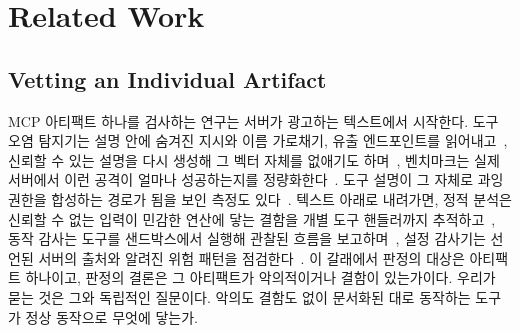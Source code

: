 \documentclass[acmsmall,screen,review,anonymous]{acmart}
\begin{document}
\section{Related Work}
\label{sec:related}

\subsection{Vetting an Individual Artifact}
\label{sec:related:artifact}

MCP 아티팩트 하나를 검사하는 연구는 서버가 광고하는 텍스트에서 시작한다. 도구 오염 탐지기는 설명 안에 숨겨진 지시와 이름 가로채기, 유출 엔드포인트를 읽어내고~\cite{jain2026detecting}, 신뢰할 수 있는 설명을 다시 생성해 그 벡터 자체를 없애기도 하며~\cite{ye2026trustdesc}, 벤치마크는 실제 서버에서 이런 공격이 얼마나 성공하는지를 정량화한다~\cite{wang2026mcptox, yang2025mcpsecbench, liu2026manual}. 도구 설명이 그 자체로 과잉 권한을 합성하는 경로가 됨을 보인 측정도 있다~\cite{rashidi2026measuring}. 텍스트 아래로 내려가면, 정적 분석은 신뢰할 수 없는 입력이 민감한 연산에 닿는 결함을 개별 도구 핸들러까지 추적하고~\cite{sun2026viper}, 동작 감사는 도구를 샌드박스에서 실행해 관찰된 흐름을 보고하며~\cite{tan2026sandscope}, 설정 감사기는 선언된 서버의 출처와 알려진 위험 패턴을 점검한다~\cite{patel2026mcpaudit, snyk2026agentscan}. 이 갈래에서 판정의 대상은 아티팩트 하나이고, 판정의 결론은 그 아티팩트가 악의적이거나 결함이 있는가이다. 우리가 묻는 것은 그와 독립적인 질문이다. 악의도 결함도 없이 문서화된 대로 동작하는 도구가 정상 동작으로 무엇에 닿는가.
\end{document}
